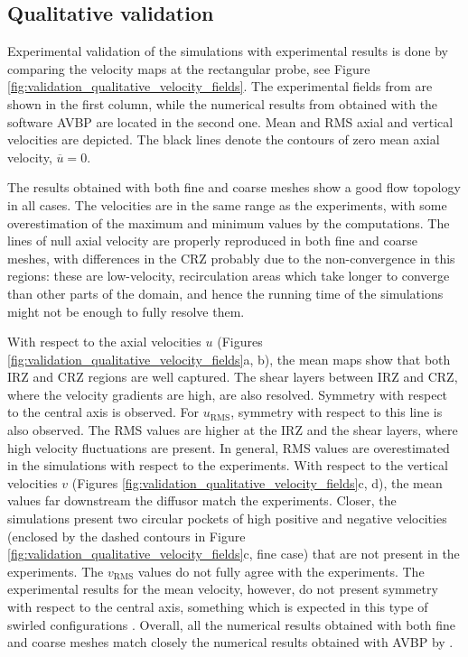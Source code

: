 
\vspace{-0.1in}
\subsection{Qualitative validation}

Experimental validation of the simulations with experimental results is done by comparing the velocity maps at the rectangular probe, see Figure \ref{fig:validation_qualitative_velocity_fields}. The experimental fields from  are shown in the first column, while the numerical results from  obtained with the software AVBP are located in the second one. Mean and RMS axial and vertical velocities are depicted. The black lines denote the contours of zero mean axial velocity, $\overline{u} = 0$.

The results obtained with both fine and coarse meshes show a good flow topology in all cases. The velocities are in the same range as the experiments, with some overestimation of the maximum and minimum values by the computations. The lines of null axial velocity are properly reproduced in both fine and coarse meshes, with differences in the CRZ probably due to the non-convergence in this regions: these are low-velocity, recirculation areas which take longer to converge than other parts of the domain, and hence the running time of the simulations might not be enough to fully resolve them. 

With respect to the axial velocities $u$ (Figures \ref{fig:validation_qualitative_velocity_fields}a, b), the mean maps show that both IRZ and CRZ regions are well captured. The shear layers between IRZ and CRZ, where the velocity gradients are high, are also resolved. Symmetry with respect to the central axis is observed. For $u_\mathrm{RMS}$, symmetry with respect to this line is also observed. The RMS values are higher at the IRZ and the shear layers, where high velocity fluctuations are present. In general, RMS values are overestimated in the simulations with respect to the experiments. With respect to the vertical velocities $v$ (Figures \ref{fig:validation_qualitative_velocity_fields}c, d), the mean values far downstream the diffusor match the experiments. Closer, the simulations present two circular pockets of high positive and negative velocities (enclosed by the dashed contours in Figure \ref{fig:validation_qualitative_velocity_fields}c, fine case) that are not present in the experiments. The $v_\mathrm{RMS}$ values do not fully agree with the experiments. The experimental results for the mean velocity, however, do not present symmetry with respect to the central axis, something which is expected in this type of swirled configurations . Overall, all the numerical results obtained with both fine and coarse meshes match closely the numerical results obtained with AVBP by .

